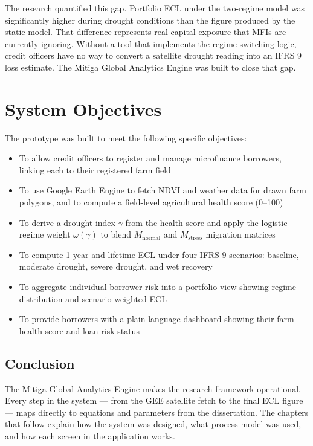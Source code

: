 \documentclass[12pt,a4paper]{article}
\newcommand{\Mnormal}{M_{\text{normal}}}
\newcommand{\Mstress}{M_{\text{stress}}}
\begin{document}
The research quantified this gap. Portfolio ECL under the two-regime model was significantly higher during drought conditions than the figure produced by the static model. That difference represents real capital exposure that MFIs are currently ignoring. Without a tool that implements the regime-switching logic, credit officers have no way to convert a satellite drought reading into an IFRS 9 loss estimate. The Mitiga Global Analytics Engine was built to close that gap.

\section{System Objectives}

The prototype was built to meet the following specific objectives:

\begin{itemize}[noitemsep]
    \item To allow credit officers to register and manage microfinance borrowers, linking each to their registered farm field
    \item To use Google Earth Engine to fetch NDVI and weather data for drawn farm polygons, and to compute a field-level agricultural health score (0--100)
    \item To derive a drought index $\gamma$ from the health score and apply the logistic regime weight $\omega(\gamma)$ to blend $\Mnormal$ and $\Mstress$ migration matrices
    \item To compute 1-year and lifetime ECL under four IFRS 9 scenarios: baseline, moderate drought, severe drought, and wet recovery
    \item To aggregate individual borrower risk into a portfolio view showing regime distribution and scenario-weighted ECL
    \item To provide borrowers with a plain-language dashboard showing their farm health score and loan risk status
\end{itemize}

\subsection*{Conclusion}

The Mitiga Global Analytics Engine makes the research framework operational. Every step in the system --- from the GEE satellite fetch to the final ECL figure --- maps directly to equations and parameters from the dissertation. The chapters that follow explain how the system was designed, what process model was used, and how each screen in the application works.
\end{document}
